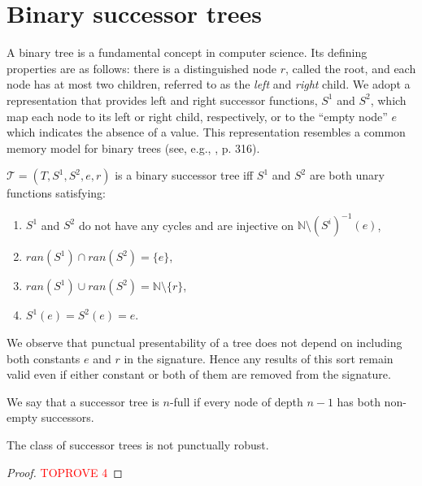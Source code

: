 \documentclass[a4paper,UKenglish,cleveref, autoref, thm-restate]{lipics-v2021}
\begin{document}


\appendix


\section{Binary successor trees}\label{app:succ-trees}

A binary tree is a fundamental concept in computer science. Its defining properties are as follows: there is a distinguished node $r$, called the root, and each node has at most two children, referred to as the \emph{left} and \emph{right} child. We adopt a representation that provides left and right successor functions, $S^1$ and $S^2$, which map each node to its left or right child, respectively, or to the “empty node” $e$ which indicates the absence of a value. This representation resembles a common memory model for binary trees (see, e.g., \cite{knuth_art_1968}, p. 316).
\begin{definition}
  $\mathcal{T}=(T,S^1,S^2,e,r)$ is a binary successor tree iff $S^1$ and $S^2$ are both unary functions satisfying:
  \begin{enumerate}
      \item $S^1$ and $S^2$ do not have any cycles and are injective on $\mathbb{N} \setminus (S^i)^{-1}(e)$,
      \item $ran(S^1) \cap ran(S^2) = \{e\}$,
      \item $ran(S^1) \cup ran(S^2) = \mathbb{N}\setminus \{r\}$,
      \item $S^1(e)=S^2(e)=e$.
  \end{enumerate}
\end{definition}

We observe that punctual presentability of a tree does not depend on including both constants $e$ and $r$ in the signature. Hence any results of this sort remain valid even if either constant or both of them are removed from the signature.

\begin{definition}
   We say that a successor tree is $n$-full if every node of depth $n-1$ has both non-empty successors.
\end{definition}



\begin{theorem}
    The class of successor trees is not punctually robust.
\end{theorem}

\begin{proof}\textcolor{red}{TOPROVE 4}\end{proof}
\end{document}
